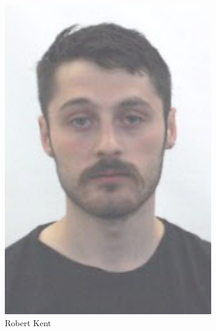 \begin{figure}
\begin{subfigure}[b]{0.45\textwidth}
        \includegraphics[height=0.3\textheight]{Files/RK}
        \caption{Robert Kent}
    \end{subfigure}
    ~~~~
    \begin{subfigure}[b]{0.45\textwidth}
        \centering

\end{subfigure}
\end{figure}
